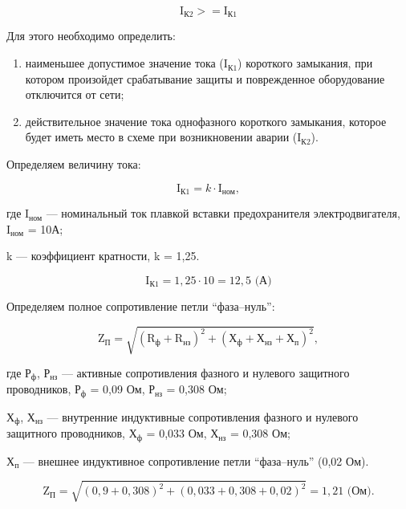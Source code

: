 \begin{displaymath}
  \text{I}_{\text{К2}} >= \text{I}_{\text{К1}}
\end{displaymath}

Для этого необходимо определить:

\begin{enumerate}
	\item наименьшее допустимое значение тока (\(\text{I}_{\text{К1}}\)) короткого замыкания, при котором произойдет срабатывание защиты и поврежденное оборудование отключится от сети;
	\item действительное значение тока однофазного короткого замыкания, которое будет иметь место в схеме при возникновении аварии (\(\text{I}_{\text{К2}}\)).
\end{enumerate}

Определяем величину тока:

\begin{displaymath}
  \text{I}_{\text{К1}} = k\cdot\text{I}_\text{ном},
\end{displaymath}

где \(\text{I}_\text{ном}\) --- номинальный ток плавкой вставки предохранителя электродвигателя, \(\text{I}_\text{ном}\) = 10А;

k --- коэффициент кратности, k = 1,25.

\begin{displaymath}
  \text{I}_{\text{К1}} = 1,25\cdot10 = 12,5\text{ (А)}
\end{displaymath}

Определяем полное сопротивление петли “фаза–нуль”:

\begin{displaymath}
  \text{Z}_\text{П} = \sqrt{(\text{R}_\text{ф}+\text{R}_\text{нз})^2+(\text{Х}_\text{ф}+\text{Х}_\text{нз}+\text{Х}_\text{п})^2},
\end{displaymath}

где \(\text{Р}_\text{ф}\), \(\text{Р}_\text{нз}\) --- активные сопротивления фазного и нулевого защитного проводников, \(\text{Р}_\text{ф}\) = 0,09 Ом, \(\text{Р}_\text{нз}\) = 0,308 Ом;

\(\text{Х}_\text{ф}\), \(\text{Х}_\text{нз}\) --- внутренние индуктивные сопротивления фазного и нулевого защитного проводников, \(\text{Х}_\text{ф}\) = 0,033 Ом, \(\text{Х}_\text{нз}\) = 0,308 Ом;

\(\text{Х}_\text{п}\) --- внешнее индуктивное сопротивление петли “фаза–нуль” (0,02 Ом).

\begin{displaymath}
  \text{Z}_\text{П} = \sqrt{(0,9+0,308)^2+(0,033+0,308+0,02)^2} = 1,21 \text{ (Ом)}.
\end{displaymath}


